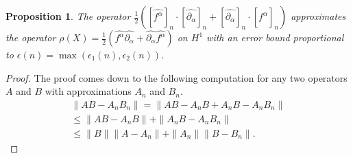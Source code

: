 \documentclass[12pt]{amsart}
\newtheorem{prop}[thm]{Proposition}
\begin{document}
\begin{prop}
	The operator $\frac{1}{2} ( [\widehat{f^\alpha}]_n \cdot [\widehat{\partial_\alpha}]_n + [\widehat{\partial_\alpha}]_n \cdot [\widehat{f^\alpha}]_n)$
	approximates the operator $\rho(X) = \frac{1}{2}( \widehat{f^\alpha}  \widehat{\partial_\alpha} +  \widehat{\partial_\alpha}  \widehat{f^\alpha} )$
	on $H^1$	with an error bound proportional to $\epsilon(n) = \max( \epsilon_1(n) , \epsilon_2(n) )$.
\end{prop}
\begin{proof}
	The proof comes down to the following computation for any two operators $A$ and $B$ with approximations $A_n$ and $B_n$.
	\begin{align*}
		\| AB - A_n B_n \| = \| AB - A_n B + A_n B- A_n B_n \| \\
		\leq \| AB - A_n B \| + \| A_nB - A_n B_n \| \\
		\leq \|B \| \|A - A_n \| + \|A_n \| \|B - B_n \|.
	\end{align*}
\end{proof}

\appendix
\end{document}
